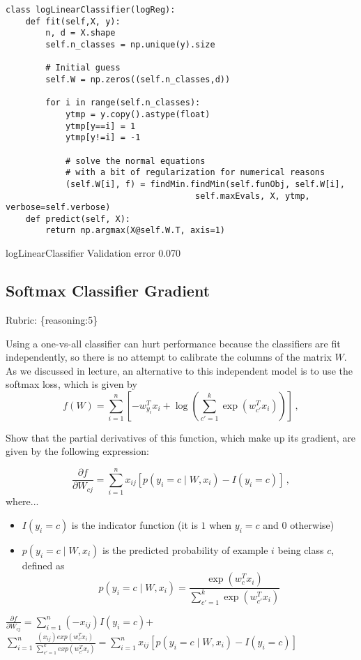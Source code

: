 \documentclass{article}
\def\rubric#1{\gre{Rubric: \{#1\}}}{}
\def\blu#1{{\color{blu}#1}}
\def\gre#1{{\color{gre}#1}}
\def\red#1{{\color{red}#1}}
\begin{document}
\begin{lstlisting}
class logLinearClassifier(logReg):
    def fit(self,X, y):
        n, d = X.shape
        self.n_classes = np.unique(y).size

        # Initial guess
        self.W = np.zeros((self.n_classes,d))

        for i in range(self.n_classes):
            ytmp = y.copy().astype(float)
            ytmp[y==i] = 1
            ytmp[y!=i] = -1

            # solve the normal equations
            # with a bit of regularization for numerical reasons
            (self.W[i], f) = findMin.findMin(self.funObj, self.W[i],
                                      self.maxEvals, X, ytmp, verbose=self.verbose)
    def predict(self, X):
        return np.argmax(X@self.W.T, axis=1)
\end{lstlisting}

\red{logLinearClassifier Validation error 0.070}


\subsection{Softmax Classifier Gradient}
\rubric{reasoning:5}

Using a one-vs-all classifier can hurt performance because the classifiers are fit independently, so there is no attempt to calibrate the columns of the matrix $W$. As we discussed in lecture, an alternative to this independent model is to use the softmax loss, which is given by
\[
f(W) = \sum_{i=1}^n \left[-w_{y_i}^Tx_i + \log\left(\sum_{c' = 1}^k \exp(w_{c'}^Tx_i)\right)\right] \, ,
\]

\blu{Show that the partial derivatives of this function, which make up its gradient, are given by the following expression:}

\[
\frac{\partial f}{\partial W_{cj}} = \sum_{i=1}^n x_{ij}[p(y_i=c \mid W,x_i) - I(y_i = c)] \, ,
\]
where...
\begin{itemize}
\item $I(y_i = c)$ is the indicator function (it is $1$ when $y_i=c$ and $0$ otherwise)
\item $p(y_i=c \mid W, x_i)$ is the predicted probability of example $i$ being class $c$, defined as
\[
p(y_i=c \mid W, x_i) = \frac{\exp(w_c^Tx_i)}{\sum_{c'=1}^k\exp(w_{c'}^Tx_i)}
\]

\end{itemize}

\red{$\frac{\partial f}{\partial W_{cj}} = \sum_{i=1}^n(-x_{ij})I(y_i=c)$+$\sum_{i=1}^n\frac{(x_{ij})exp(w_c^Tx_i)}{\sum_{c'=1}^{k}exp(w_{c'}^{T}x_i)}=\sum_{i=1}^n x_{ij}[p(y_i=c \mid W,x_i) - I(y_i = c)]$}
\end{document}
